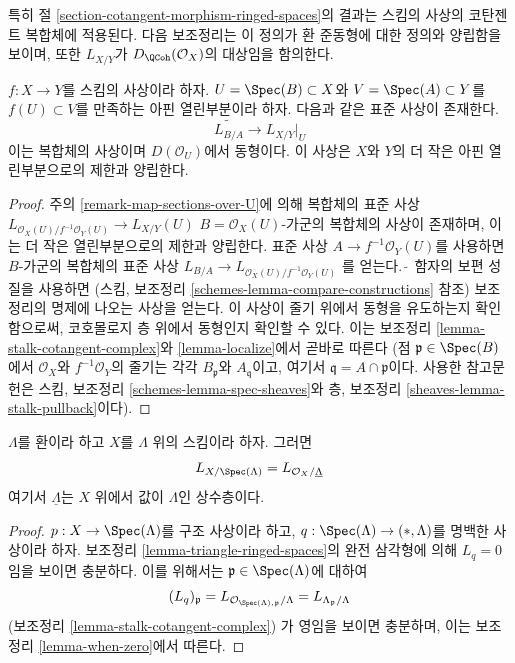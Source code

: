 \noindent
특히 절 \ref{section-cotangent-morphism-ringed-spaces}의 결과는
스킴의 사상의 코탄젠트 복합체에 적용된다.
다음 보조정리는 이 정의가 환 준동형에 대한 정의와 양립함을 보이며,
또한 $L_{X/Y}$가 $D_\QCoh(\mathcal{O}_X)$의 대상임을 함의한다.

\begin{lemma}
\label{lemma-morphism-affine-schemes}
$f : X \to Y$를 스킴의 사상이라 하자. $U = \Spec(B) \subset X$와
$V = \Spec(A) \subset Y$를 $f(U) \subset V$를 만족하는 아핀 열린부분이라 하자.
다음과 같은 표준 사상이 존재한다.
$$
\widetilde{L_{B/A}} \longrightarrow L_{X/Y}|_U
$$
이는 복합체의 사상이며 $D(\mathcal{O}_U)$에서 동형이다.
이 사상은 $X$와 $Y$의 더 작은 아핀 열린부분으로의 제한과 양립한다.
\end{lemma}

\begin{proof}
주의 \ref{remark-map-sections-over-U}에 의해 복합체의 표준 사상
$L_{\mathcal{O}_X(U)/f^{-1}\mathcal{O}_Y(U)} \to L_{X/Y}(U)$
$B = \mathcal{O}_X(U)$-가군의 복합체의 사상이 존재하며, 이는 더 작은
열린부분으로의 제한과 양립한다. 표준 사상
$A \to f^{-1}\mathcal{O}_Y(U)$를 사용하면 $B$-가군의 복합체의 표준 사상
$L_{B/A} \to L_{\mathcal{O}_X(U)/f^{-1}\mathcal{O}_Y(U)}$
를 얻는다.
$\widetilde{\ }$ 함자의 보편 성질을 사용하면
(스킴, 보조정리 \ref{schemes-lemma-compare-constructions} 참조)
보조정리의 명제에 나오는 사상을 얻는다.
이 사상이 줄기 위에서 동형을 유도하는지 확인함으로써,
코호몰로지 층 위에서 동형인지 확인할 수 있다.
이는 보조정리 \ref{lemma-stalk-cotangent-complex}와
\ref{lemma-localize}에서 곧바로 따른다
(점 $\mathfrak p \in \Spec(B)$에서 $\mathcal{O}_X$와
$f^{-1}\mathcal{O}_Y$의 줄기는 각각 $B_\mathfrak p$와
$A_\mathfrak q$이고, 여기서 $\mathfrak q = A \cap \mathfrak p$이다.
사용한 참고문헌은 스킴, 보조정리 \ref{schemes-lemma-spec-sheaves}와
층, 보조정리 \ref{sheaves-lemma-stalk-pullback}이다).
\end{proof}

\begin{lemma}
\label{lemma-scheme-over-ring}
$\Lambda$를 환이라 하고 $X$를 $\Lambda$ 위의 스킴이라 하자. 그러면
$$
L_{X/\Spec(\Lambda)} = L_{\mathcal{O}_X/\underline{\Lambda}}
$$
여기서 $\underline{\Lambda}$는 $X$ 위에서 값이 $\Lambda$인 상수층이다.
\end{lemma}

\begin{proof}
$p : X \to \Spec(\Lambda)$를 구조 사상이라 하고,
$q : \Spec(\Lambda) \to (*, \Lambda)$를 명백한 사상이라 하자.
보조정리 \ref{lemma-triangle-ringed-spaces}의 완전 삼각형에 의해
$L_q = 0$임을 보이면 충분하다. 이를 위해서는
$\mathfrak p \in \Spec(\Lambda)$에 대하여
$$
(L_q)_\mathfrak p =
L_{\mathcal{O}_{\Spec(\Lambda), \mathfrak p}/\Lambda} =
L_{\Lambda_\mathfrak p/\Lambda}
$$
(보조정리 \ref{lemma-stalk-cotangent-complex})
가 영임을 보이면 충분하며, 이는 보조정리 \ref{lemma-when-zero}에서 따른다.
\end{proof}






